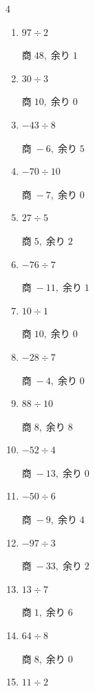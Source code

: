 \begin{multicols}{4}
\begin{enumerate}
        $商\; 5,\; 余り\; 8$

  \item $97 \div 2$

        $商\; 48,\; 余り\; 1$

  \item $30 \div 3$

        $商\; 10,\; 余り\; 0$

  \item $-43 \div 8$

        $商\; -6,\; 余り\; 5$

  \item $-70 \div 10$

        $商\; -7,\; 余り\; 0$

  \item $27 \div 5$

        $商\; 5,\; 余り\; 2$

  \item $-76 \div 7$

        $商\; -11,\; 余り\; 1$

  \item $10 \div 1$

        $商\; 10,\; 余り\; 0$

\columnbreak %

  \item $-28 \div 7$

        $商\; -4,\; 余り\; 0$

  \item $88 \div 10$

        $商\; 8,\; 余り\; 8$

  \item $-52 \div 4$

        $商\; -13,\; 余り\; 0$

  \item $-50 \div 6$

        $商\; -9,\; 余り\; 4$

  \item $-97 \div 3$

        $商\; -33,\; 余り\; 2$

  \item $13 \div 7$

        $商\; 1,\; 余り\; 6$

  \item $64 \div 8$

        $商\; 8,\; 余り\; 0$

  \item $11 \div 2$


\end{enumerate}
\end{multicols}
